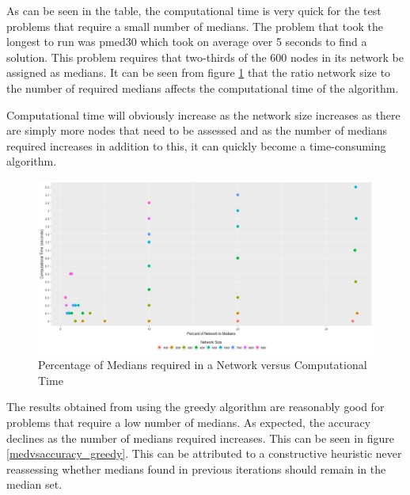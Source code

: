 \documentclass[11pt]{article}
\begin{document}
	As can be seen in the table, the computational time is very quick for the test problems that require a small number of medians.  The problem that took the longest to run was pmed30 which took on average over 5 seconds to find a solution.  This problem requires that two-thirds of the 600 nodes in its network be assigned as medians.  It can be seen from figure \ref{percentmedvstime_greedy} that the ratio network size to the number of required medians affects the computational time of the algorithm.
	
	Computational time will obviously increase as the network size increases as there are simply more nodes that need to be assessed and as the number of medians required increases in addition to this, it can quickly become a time-consuming algorithm.
	
	\begin{figure}[H]
		\begin{center}
			\includegraphics[width=14cm]{percentmedvstime_greedy.png}
			\caption{Percentage of Medians required in a Network versus Computational Time}
			\label{percentmedvstime_greedy}
		\end{center}
	\end{figure}
	
	The results obtained from using the greedy algorithm are reasonably good for problems that require a low number of medians.  As expected, the accuracy declines as the number of medians required increases.  This can be seen in figure \ref{medvsaccuracy_greedy}.  This can be attributed to a constructive heuristic never reassessing whether medians found in previous iterations should remain in the median set.
	
\end{document}
